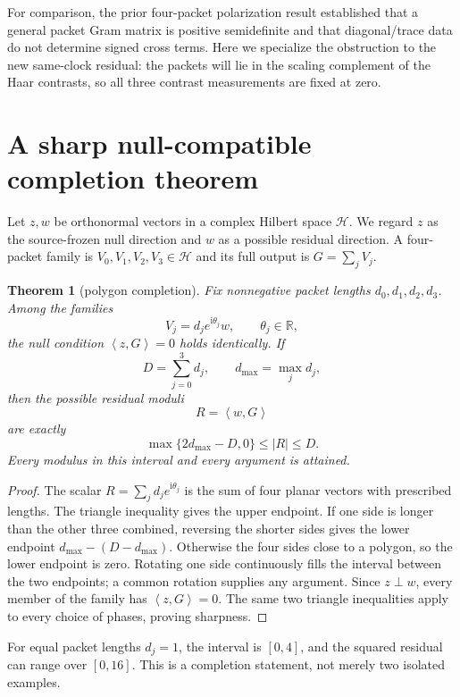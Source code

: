 \documentclass[11pt]{article}
\newtheorem{theorem}{Theorem}
\theoremstyle{definition}
\newcommand{\HH}{\mathcal H}
\newcommand{\ip}[2]{\left\langle #1,#2\right\rangle}
\newcommand{\ii}{\mathrm i}
\begin{document}
For comparison, the prior four-packet polarization result established that a
general packet Gram matrix is positive semidefinite and that diagonal/trace data
do not determine signed cross terms.  Here we specialize the obstruction to the
new same-clock residual: the packets will lie in the scaling complement of the
Haar contrasts, so all three contrast measurements are fixed at zero.

\section{A sharp null-compatible completion theorem}

Let $z,w$ be orthonormal vectors in a complex Hilbert space $\HH$.  We regard $z$
as the source-frozen null direction and $w$ as a possible residual direction.  A
four-packet family is $V_0,V_1,V_2,V_3\in\HH$ and its full output is
$G=\sum_jV_j$.

\begin{theorem}[polygon completion]
Fix nonnegative packet lengths $d_0,d_1,d_2,d_3$.  Among the families
\[
 V_j=d_j e^{\ii\theta_j}w,
 \qquad \theta_j\in\mathbb R,
 \]
the null condition $\ip{z}{G}=0$ holds identically.  If
\[
 D=\sum_{j=0}^3d_j,\qquad d_{\max}=\max_jd_j,
\]
then the possible residual moduli
\[
 R=\ip{w}{G}
\]
are exactly
\begin{equation}
 \max\{2d_{\max}-D,0\}\leq |R|\leq D.
 \label{eq:polygon}
\end{equation}
Every modulus in this interval and every argument is attained.
\end{theorem}

\begin{proof}
The scalar $R=\sum_jd_je^{\ii\theta_j}$ is the sum of four planar vectors with
prescribed lengths.  The triangle inequality gives the upper endpoint.  If one
side is longer than the other three combined, reversing the shorter sides gives
the lower endpoint $d_{\max}-(D-d_{\max})$.  Otherwise the four sides close to a
polygon, so the lower endpoint is zero.  Rotating one side continuously fills the
interval between the two endpoints; a common rotation supplies any argument.
Since $z\perp w$, every member of the family has $\ip{z}{G}=0$.  The same two
triangle inequalities apply to every choice of phases, proving sharpness.
\end{proof}

For equal packet lengths $d_j=1$, the interval is $[0,4]$, and the squared
residual can range over $[0,16]$.  This is a completion statement, not merely two
isolated examples.
\end{document}
